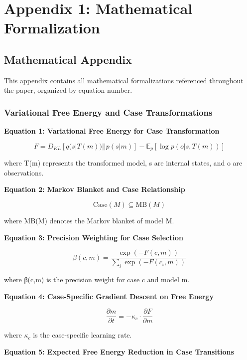 \documentclass[
]{book}
\author{}
\date{}
\begin{document}
\frontmatter

\mainmatter
\hypertarget{appendix-1-mathematical-formalization}{%
\chapter{Appendix 1: Mathematical
Formalization}\label{appendix-1-mathematical-formalization}}

\hypertarget{mathematical-appendix}{%
\section{Mathematical Appendix}\label{mathematical-appendix}}

This appendix contains all mathematical formalizations referenced
throughout the paper, organized by equation number.

\hypertarget{variational-free-energy-and-case-transformations}{%
\subsection{Variational Free Energy and Case
Transformations}\label{variational-free-energy-and-case-transformations}}

\textbf{Equation 1: Variational Free Energy for Case Transformation}

\[
F = D_{KL}[q(s|T(m))||p(s|m)] - \mathbb{E}_{p}[\log p(o|s,T(m))]  \tag{1}
\]

where T(m) represents the transformed model, s are internal states, and
o are observations.

\textbf{Equation 2: Markov Blanket and Case Relationship}

\[\text{Case}(M) \subseteq \text{MB}(M)  \tag{2}\]

where MB(M) denotes the Markov blanket of model M.

\textbf{Equation 3: Precision Weighting for Case Selection}

\[\beta(c,m) = \frac{\exp(-F(c,m))}{\sum_{i}\exp(-F(c_i,m))}  \tag{3}\]

where β(c,m) is the precision weight for case c and model m.

\textbf{Equation 4: Case-Specific Gradient Descent on Free Energy}

\[\frac{\partial m}{\partial t} = -\kappa_c \cdot \frac{\partial F}{\partial m}  \tag{4}\]

where \(\kappa_c\) is the case-specific learning rate.

\textbf{Equation 5: Expected Free Energy Reduction in Case Transitions}
\end{document}
